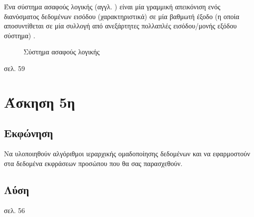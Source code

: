 \documentclass{assignment}
\begin{document}
Ένα σύστημα ασαφούς λογικής (αγγλ. ) είναι μία γραμμική απεικόνιση ενός διανύσματος δεδομένων εισόδου (χαρακτηριστικά) σε μία βαθμωτή έξοδο (η οποία αποσυντίθεται σε μία συλλογή από ανεξάρτητες πολλαπλές εισόδου/μονής εξόδου σύστημα) \cite{mendel364485,class_notes}.

\begin{figure}
\begin{center}
\caption{Σύστημα ασαφούς λογικής \cite{mendel364485,class_notes}}
\label{fig:fuzzy_logic_system}
\end{center}
\end{figure}


σελ. 59

\section{Άσκηση 5η}
\subsection{Εκφώνηση}

Να υλοποιηθούν αλγόριθμοι ιεραρχικής ομαδοποίησης δεδομένων και να εφαρμοστούν στα δεδομένα εκφράσεων προσώπου που θα σας παρασχεθούν.

\subsection {Λύση}


σελ. 56



 \label{Βιβλιογραφία}



\newpage
\end{document}
